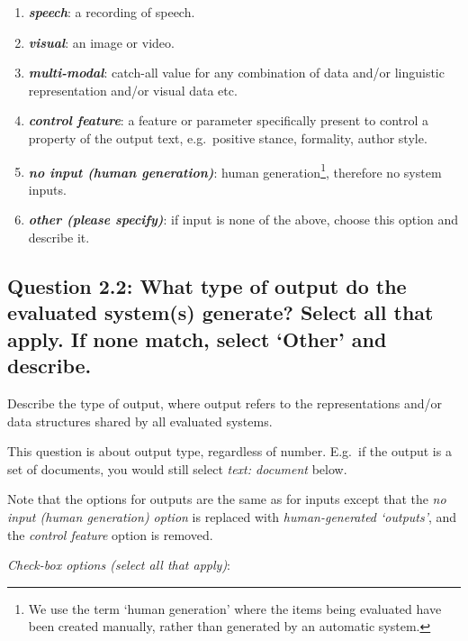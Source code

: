 \documentclass[11pt,a4paper]{article}
\newcommand{\egcvalue}[1]{\textbf{\textit{#1}}}
\begin{document}
\begin{enumerate}[itemsep=0cm,leftmargin=0.5cm,label={\small $\square$}]
            \item \egcvalue{speech}: a recording of speech.
            
            \item \egcvalue{visual}: an image or video.
            
            \item \egcvalue{multi-modal}: catch-all value for any combination of data and/or linguistic representation and/or visual data etc.
            
            \item \egcvalue{control feature}: a feature or parameter specifically present to control a property of the output text, e.g.\ positive stance, formality, author style.
            
            \item \egcvalue{no input (human generation)}: human generation\footnote{\label{human-generation}We use the term `human generation' where the items being evaluated have been created manually, rather than generated by an automatic system.}, therefore no system inputs.
            
            \item \egcvalue{other (please specify)}: if input is none of the above, choose this option and describe it. 
            
\end{enumerate}

\vspace{-.3cm}
\subsection*{Question 2.2: What type of output do the evaluated system(s) generate? Select all that apply. If none match, select `Other' and describe.}\label{sec:output}

Describe the type of output, where output refers to the representations and/or data structures shared by all evaluated systems.

This question is about output type, regardless of number. E.g.\ if the output is a set of documents, you would still select \textit{text: document} below.

Note that the options for outputs are the same as for inputs except that the \textit{no input (human generation) option} is replaced with \textit{human-generated `outputs'}, and the \textit{control feature} option is removed.


\vspace{.3cm}
\noindent\textit{Check-box options (select all that apply)}: 
\vspace{-.1cm}
\end{document}
